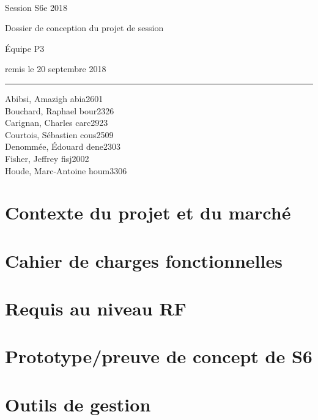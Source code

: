 \documentclass[12pt,titlepage=true,letterpaper,pointlessnumbers,headings=normal,captions=nooneline]{scrartcl}
\begin{document}
\thispagestyle{empty}
\noindent
\begin{center}
{\scshape {}\\[4pt] }

\vspace{3cm}
\textsf{\large Session S6e 2018}

\vspace{.5cm}
\textsf{\Large Dossier de conception du projet de session}

\vspace{.3cm}
\textsf{\large Équipe P3}

\vspace{.25cm}
\textsf{\footnotesize remis le 20 septembre 2018}

\end{center}
\vfill

\noindent
\rule{\linewidth}{.8pt}

\noindent
Abibsi, Amazigh \hfill abia2601\\
Bouchard, Raphael \hfill bour2326\\
Carignan, Charles \hfill carc2923\\
Courtois, Sébastien \hfill cous2509\\
Denommée, Édouard \hfill dene2303\\
Fisher, Jeffrey \hfill fisj2002\\
Houde, Marc-Antoine \hfill houm3306\\


\newpage
\tableofcontents

\newpage
\listoffigures

\newpage
\listoftables


\newpage
\section{Contexte du projet et du marché}

\section{Cahier de charges fonctionnelles}

\section{Requis au niveau RF}

\section{Prototype/preuve de concept de S6}

\section{Outils de gestion}
\end{document}
